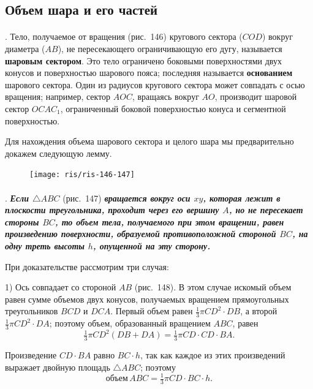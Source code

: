 \documentclass[twoside]{book}
\begin{document}
\subsection*{Объем шара и его частей}

\paragraph{}\label{1938/s140}
.
Тело, получаемое от вращения (рис.~146) кругового сектора ($COD$) вокруг диаметра ($AB$), не пересекающего ограничивающую его дугу, называется \textbf{шаровым сектором}.
Это тело ограничено боковыми поверхностями двух конусов и поверхностью шарового пояса;
последняя называется \textbf{основанием} шарового сектора.
Один из радиусов кругового сектора может совпадать с осью вращения;
например, сектор $AOC$, вращаясь вокруг $AO$, производит шаровой сектор $OCAC_1$, ограниченный боковой поверхностью конуса и сегментной поверхностью.

Для нахождения объема шарового сектора и целого шара мы предварительно докажем следующую лемму.

\begin{figure}[h!]
\centering
\texttt{[image: ris/ris-146-147]}
\caption{}
\end{figure}

\paragraph{}\label{1938/s141}
.
\textbf{\emph{Если $\triangle ABC$}} (рис.~147) \textbf{\emph{вращается вокруг оси $xy$, которая лежит в плоскости треугольника, проходит через его вершину $A$, но не пересекает стороны $BC$, то объем тела, получаемого при этом вращении, равен произведению поверхности, образуемой противоположной стороной $BC$, на одну треть высоты $h$, опущенной на эту сторону.}}

При доказательстве рассмотрим три случая:

1) Ось совпадает со стороной $AB$ (рис.~148).
В этом случае искомый объем равен сумме объемов двух конусов, получаемых вращением прямоугольных треугольников $BCD$ и $DCA$.
Первый объем равен $\tfrac13 \pi CD^2\cdot DB$, а второй $\tfrac13\pi CD^2\cdot DA$;
поэтому объем, образованный вращением $ABC$, равен 
\[\tfrac13\pi CD^2(DB + DA) = \tfrac13\pi CD\cdot CD\cdot BA.\]

Произведение $CD\cdot BA$ равно $BC\cdot h$, так как каждое из этих произведений выражает двойную площадь $\triangle ABC$; %
поэтому
\[\text{объем}\, ABC = \tfrac13\pi CD\cdot BC\cdot h.\]
\end{document}
